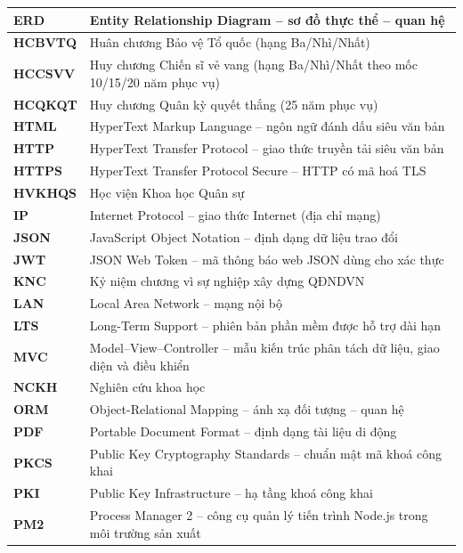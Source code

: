 \documentclass[../DoAn.tex]{subfiles}
\begin{document}
\begin{longtable}{|>{\centering\arraybackslash}p{3.2cm}|p{10.8cm}|}
\textbf{ERD}      & Entity Relationship Diagram -- sơ đồ thực thể -- quan hệ \\ \hline
\textbf{HCBVTQ}   & Huân chương Bảo vệ Tổ quốc (hạng Ba/Nhì/Nhất) \\ \hline
\textbf{HCCSVV}   & Huy chương Chiến sĩ vẻ vang (hạng Ba/Nhì/Nhất theo mốc 10/15/20 năm phục vụ) \\ \hline
\textbf{HCQKQT}   & Huy chương Quân kỳ quyết thắng (25 năm phục vụ) \\ \hline
\textbf{HTML}     & HyperText Markup Language -- ngôn ngữ đánh dấu siêu văn bản \\ \hline
\textbf{HTTP}     & HyperText Transfer Protocol -- giao thức truyền tải siêu văn bản \\ \hline
\textbf{HTTPS}    & HyperText Transfer Protocol Secure -- HTTP có mã hoá TLS \\ \hline
\textbf{HVKHQS}   & Học viện Khoa học Quân sự \\ \hline
\textbf{IP}       & Internet Protocol -- giao thức Internet (địa chỉ mạng) \\ \hline
\textbf{JSON}     & JavaScript Object Notation -- định dạng dữ liệu trao đổi \\ \hline
\textbf{JWT}      & JSON Web Token -- mã thông báo web JSON dùng cho xác thực \\ \hline
\textbf{KNC}      & Kỷ niệm chương vì sự nghiệp xây dựng QĐNDVN \\ \hline
\textbf{LAN}      & Local Area Network -- mạng nội bộ \\ \hline
\textbf{LTS}      & Long-Term Support -- phiên bản phần mềm được hỗ trợ dài hạn \\ \hline
\textbf{MVC}      & Model--View--Controller -- mẫu kiến trúc phân tách dữ liệu, giao diện và điều khiển \\ \hline
\textbf{NCKH}     & Nghiên cứu khoa học \\ \hline
\textbf{ORM}      & Object-Relational Mapping -- ánh xạ đối tượng -- quan hệ \\ \hline
\textbf{PDF}      & Portable Document Format -- định dạng tài liệu di động \\ \hline
\textbf{PKCS}     & Public Key Cryptography Standards -- chuẩn mật mã khoá công khai \\ \hline
\textbf{PKI}      & Public Key Infrastructure -- hạ tầng khoá công khai \\ \hline
\textbf{PM2}      & Process Manager 2 -- công cụ quản lý tiến trình Node.js trong môi trường sản xuất \\ \hline

\end{longtable}
\end{document}
